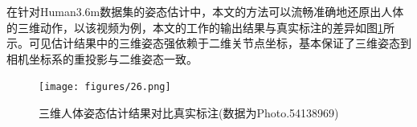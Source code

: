 在针对Human3.6m数据集的姿态估计中，本文的方法可以流畅准确地还原出人体的三维动作，以该视频为例，本文的工作的输出结果与真实标注的差异如图\ref{fig:f26}所示。可见估计结果中的三维姿态强依赖于二维关节点坐标，基本保证了三维姿态到相机坐标系的重投影与二维姿态一致。

\begin{figure}[h]
	\centering
	\texttt{[image: figures/26.png]}
	\caption{三维人体姿态估计结果对比真实标注(数据为Photo.54138969)}
	\label{fig:f26}
\end{figure}













